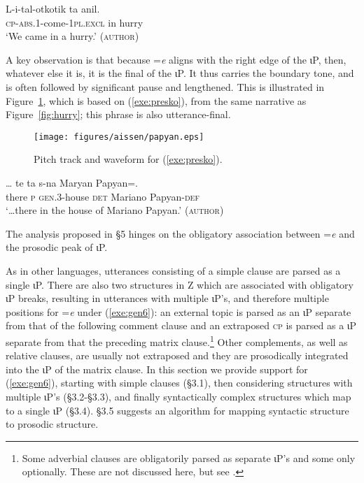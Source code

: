 \documentclass[output=paper,
modfonts
]{LSP/langsci}
\begin{document}
\begin{exe}
\ex
\gll L-i-tal-otkotik ta anil. \\
\textsc{cp-abs.1}-come-\textsc{1pl.excl} in hurry \\
\glt `We came in a hurry.'  (\textsc{author})
\label{exe:hurry}
\end{exe}

A key observation is that because =\emph{e} aligns with the right edge of the ιP, then, whatever else it is, it is the 
final  of the ιP. It thus carries the boundary tone, and is often followed by significant pause and lengthened.
This is illustrated in Figure~\ref{fig:presko}, which is based on (\ref{exe:presko}), from the same narrative as Figure~\ref{fig:hurry}; this phrase is also utterance-final.

\begin{figure}
 	\texttt{[image: figures/aissen/papyan.eps]}
	\caption{Pitch track and waveform for (\ref{exe:presko}).}
	\label{fig:presko}
\end{figure}

\begin{exe}
\ex\label{exe:presko}\bridgeoverex
\gll \dots {}  te ta s-na  Maryan Papyan=. \\
{} there \textsc{p} \textsc{gen.3}-house \textsc{det} Mariano Papyan-\textsc{def} \\
\glt `\dots there in the house of Mariano Papyan.'  (\textsc{author})
 \end{exe}

\noindent The analysis proposed in \S5 hinges on the obligatory association between =\emph{e}  and the prosodic peak of ιP. 

As in other languages, utterances consisting of a simple clause are parsed as a single  ιP. There are also two structures in Z  
which  are associated with obligatory ιP breaks, resulting in utterances with multiple  ιP's, and therefore multiple positions 
for =\emph{e} under (\ref{exe:gen6}): an external topic is parsed as an ιP separate from that of the following 
comment clause and
an extraposed \textsc{cp} is parsed as a ιP separate from that the preceding matrix clause.\footnote
{Some adverbial clauses are obligatorily parsed as separate ιP's and some only optionally. These are
not discussed here, but see \citet[59]{aissen1992}.}
Other complements, as well as relative clauses, are usually not extraposed and they are prosodically integrated into the ιP  of the matrix clause.
In this section we provide support for (\ref{exe:gen6}), starting with simple clauses (\S3.1), then considering structures with multiple  ιP's (\S3.2-\S3.3),
and finally syntactically complex structures which map to a single ιP (\S3.4).  \S3.5 suggests
an algorithm for mapping syntactic structure to prosodic structure.
\end{document}
